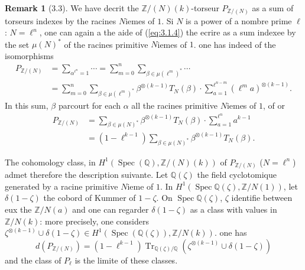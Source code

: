 \documentclass[12pt,a4paper]{article}
\theoremstyle{plain}
\theoremstyle{definition}
\newtheorem{remark}[theorem]{Remark}
\theoremstyle{remark}
\DeclareMathOperator{\Spec}{Spec}
\providecommand{\Spec}{\operatorname{Spec}}
\providecommand{\Tr}{\operatorname{Tr}}
\begin{document}
\begin{remark}[3.3]\label{rem:3.3}
We have decrit the $\mathbb{Z}/(N)(k)$-torseur $P_{\mathbb{Z}/(N)}$ as a sum
of torseurs indexes by the racines $N$iemes of $1$. Si $N$ is a power of a
nombre prime $\ell$: $N = \ell^n$, one can again a the aide of (\ref{eq:3.1.4}) the ecrire
as a sum indexee by the set $\mu(N)^*$ of the racines primitive $N$iemes of
$1$. one has indeed of the isomorphisms
\begin{align*}
P_{\mathbb{Z}/(N)} &= \sum_{\alpha^{\ell^n}=1} \cdots =
\sum_{m=0}^{n} \sum_{\beta \in \mu(\ell^m)^*} \cdots \\
&= \sum_{m=0}^{n} \sum_{\beta \in \mu(\ell^m)^*} \beta^{\otimes(k-1)} T_N(\beta) \cdot
\sum_{a=1}^{\ell^{n-m}} (\ell^m a)^{\otimes(k-1)}.
\end{align*}
In this sum, $\beta$ parcourt for each $\alpha$ all the racines primitive
$N$iemes of $1$, of or
\begin{align*}
P_{\mathbb{Z}/(N)} &= \sum_{\beta \in \mu(N)^*} \beta^{\otimes(k-1)} T_N(\beta) \cdot
\sum_{a=1}^{\ell^n} a^{k-1} \\
&= (1-\ell^{k-1}) \sum_{\beta \in \mu(N)^*} \beta^{\otimes(k-1)} T_N(\beta).
\end{align*}

The cohomology class, in $H^1(\Spec(\mathbb{Q}), \mathbb{Z}/(N)(k))$ of
$P_{\mathbb{Z}/(N)}$ ($N = \ell^n$) admet therefore the description suivante. Let
$\mathbb{Q}(\zeta)$ the field cyclotomique generated by a racine primitive
$N$ieme of $1$. In $H^1(\Spec \mathbb{Q}(\zeta), \mathbb{Z}/N(1))$, let
$\delta(1-\zeta)$ the cobord of Kummer of $1-\zeta$. On $\Spec \mathbb{Q}(\zeta)$,
$\zeta$ identifie between eux the $\mathbb{Z}/N(a)$ and one can regarder $\delta(1-\zeta)$
as a class with values in $\mathbb{Z}/N(k)$: more precisely, one considers
$\zeta^{\otimes(k-1)} \cup \delta(1-\zeta) \in H^1(\Spec(\mathbb{Q}(\zeta)),
\mathbb{Z}/N(k))$. one has
\[
d(P_{\mathbb{Z}/(N)}) = (1-\ell^{k-1}) \Tr_{\mathbb{Q}(\zeta)/\mathbb{Q}}
(\zeta^{\otimes(k-1)} \cup \delta(1-\zeta))
\]
and the class of $P_\ell$ is the limite of these classes.
\end{remark}
\end{document}
